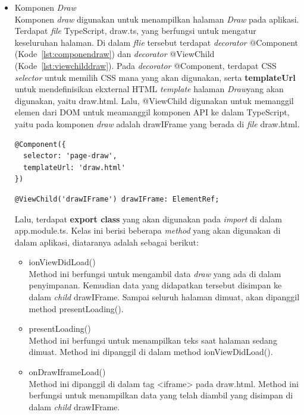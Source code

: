 \begin{itemize}
\newpage	
	
	\item Komponen \textit{Draw} \\
	Komponen \textit{draw} digunakan untuk menampilkan halaman \textit{Draw} pada aplikasi. Terdapat \textit{file} TypeScript, draw.ts, yang berfungsi untuk mengatur keseluruhan halaman. Di dalam \textit{flie} tersebut terdapat \textit{decorator} @Component (Kode~\ref{lst:componendraw}) dan \textit{decorator} @ViewChild (Kode~\ref{lst:viewchilddraw}). Pada \textit{decorator} @Component, terdapat CSS \textit{selector} untuk memilih CSS mana yang akan digunakan, serta \textbf{templateUrl} untuk mendefinisikan ekxternal HTML \textit{template} halaman \textit{Draw}yang akan digunakan, yaitu draw.html. Lalu, @ViewChild digunakan untuk memanggil elemen dari DOM untuk meamanggil komponen API ke dalam TypeScript, yaitu pada komponen \textit{draw} adalah drawIFrame yang berada di \textit{file} draw.html.
\begin{lstlisting}[language=html, label={lst:componendraw}, caption=@Component pada draw.ts]
@Component({
  selector: 'page-draw',
  templateUrl: 'draw.html'
})
\end{lstlisting} 
	
\begin{lstlisting}[language=html, label={lst:viewchilddraw}, caption=@ViewChild pada draw.ts]
@ViewChild('drawIFrame') drawIFrame: ElementRef;
\end{lstlisting} 

	Lalu, terdapat \textbf{export class} yang akan digunakan pada \textit{import} di dalam app.module.ts. Kelas ini berisi beberapa \textit{method} yang akan digunakan di dalam aplikasi, diataranya adalah sebagai berikut:
	
	\begin{itemize}
		\item ionViewDidLoad() \\
		Method ini berfungsi untuk mengambil data \textit{draw} yang ada di dalam penyimpanan. Kemudian data yang didapatkan tersebut disimpan ke dalam \textit{child} drawIFrame. Sampai seluruh halaman dimuat, akan dipanggil method presentLoading().
		\item presentLoading() \\
		Method ini berfungsi untuk menampilkan teks saat halaman sedang dimuat. Method ini dipanggil di dalam method ionViewDidLoad().
		\item onDrawIframeLoad() \\
		Method ini dipanggil di dalam tag <iframe> pada draw.html. Method ini berfungsi untuk menampilkan data yang telah diambil yang disimpan di dalam \textit{child} drawIFrame.
	\end{itemize}
	

\end{itemize}
